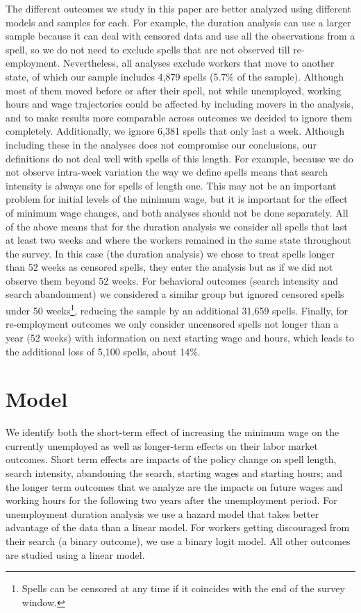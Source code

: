 \documentclass{article}
\begin{document}
The different outcomes we study in this paper are better analyzed using different models and samples for each. For example, the duration analysis can use a larger sample because it can deal with censored data and use all the observations from a spell, so we do not need to exclude spells that are not observed till re-employment. Nevertheless, all analyses exclude workers that move to another state, of which our sample includes 4,879 spells (5.7\% of the sample). Although most of them moved before or after their spell, not while unemployed, working hours and wage trajectories could be affected by including movers in the analysis, and to make results more comparable across outcomes we decided to ignore them completely. Additionally, we ignore 6,381 spells that only last a week. Although including these in the analyses does not compromise our conclusions, our definitions do not deal well with spells of this length. For example, because we do not observe intra-week variation the way we define spells means that search intensity is always one for spells of length one. This may not be an important problem for initial levels of the minimum wage, but it is important for the effect of minimum wage changes, and both analyses should not be done separately. All of the above means that for the duration analysis we consider all spells that last at least two weeks and where the workers remained in the same state throughout the survey. In this case (the duration analysis) we chose to treat spells longer than 52 weeks as censored spells, they enter the analysis but as if we did not observe them beyond 52 weeks. For behavioral outcomes (search intensity and search abandonment) we considered a similar group but ignored censored spells under 50 weeks\footnote{Spells can be censored at any time if it coincides with the end of the survey window.}, reducing the sample by an additional 31,659 spells. Finally, for re-employment outcomes we only consider uncensored spells not longer than a year (52 weeks) with information on next starting wage and hours, which leads to the additional loss of 5,100 spells, about 14\%.

\section{Model}

We identify both the short-term effect of increasing the minimum wage on the currently unemployed as well as longer-term effects on their labor market outcomes. Short term effects are impacts of the policy change on spell length, search intensity, abandoning the search, starting wages and starting hours; and the longer term outcomes that we analyze are the impacts on future wages and working hours for the following two years after the unemployment period. For unemployment duration analysis we use a hazard model that takes better advantage of the data than a linear model. For workers getting discouraged from their search (a binary outcome), we use a binary logit model.  All other outcomes are studied using a linear model.
\end{document}
